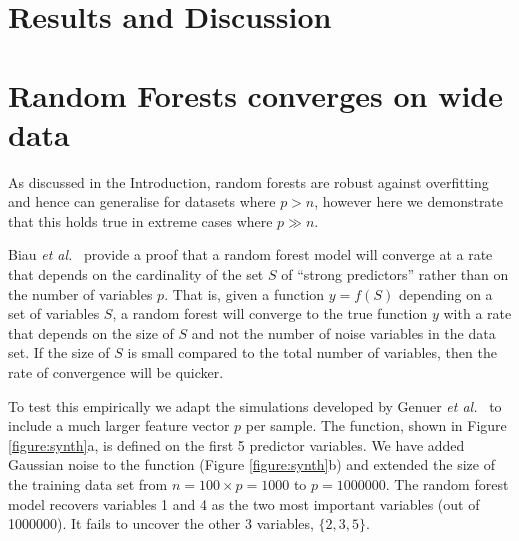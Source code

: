 \documentclass[10pt,letterpaper]{article}
\begin{document}
\section*{Results and Discussion}




\section*{Random Forests converges on wide data}

As discussed in the Introduction, random forests are robust against overfitting
and hence can generalise for datasets where $p > n$, however here we demonstrate that this holds true in extreme cases where $p \gg n$.

Biau {\it et al.}~\cite{Biau.2012} provide a proof that a random forest model will converge at a rate that depends on
the cardinality of the set $S$ of ``strong predictors'' rather than on the number of variables $p$. That is, given a
function $y=f(S)$ depending on a set of variables $S$, a random forest will converge to the true function $y$ with a
rate that depends on the size of $S$ and not the number of noise variables in the data set. If the size of $S$ is small
compared to the total number of variables, then the rate of convergence will be quicker.

To test this empirically we adapt the simulations developed by Genuer {\it et al.}~\cite{Genuer.et.al.2010} to include a
much larger feature vector $p$ per sample.  The function, shown in Figure \ref{figure:synth}a, is defined on the first 5
predictor variables. We have added Gaussian noise to the function (Figure \ref{figure:synth}b) and extended the size of
the training data set from $n=100 \times p=1000$ to $p=1000000$.
The random forest model recovers variables 1 and 4 as the two
most important variables (out of 1000000). It fails to uncover the other 3 variables, $\{2,3,5\}$.
\end{document}
